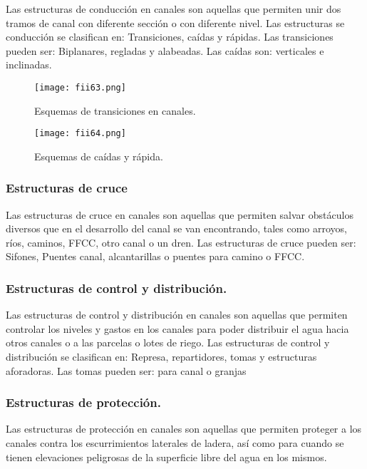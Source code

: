 Las estructuras de conducción en canales son aquellas que permiten unir dos
tramos de canal con diferente sección o con diferente nivel. Las estructuras se
conducción se clasifican en: Transiciones, caídas y rápidas. Las transiciones pueden
ser: Biplanares, regladas y alabeadas. Las caídas son: verticales e inclinadas.

\begin{figure}[h!]
	\centerline{\texttt{[image: fii63.png]}}
	\caption{Esquemas de transiciones en canales.}
	\label{fii63}
\end{figure}

\begin{figure}[h!]
	\centerline{\texttt{[image: fii64.png]}}
	\caption{Esquemas de caídas y rápida.}
	\label{fii64}
\end{figure}

\subsubsection{Estructuras de cruce}

Las estructuras de cruce en canales son aquellas que permiten salvar obstáculos
diversos que en el desarrollo del canal se van encontrando, tales como arroyos, ríos,
caminos, FFCC, otro canal o un dren.
Las estructuras de cruce pueden ser: Sifones, Puentes canal, alcantarillas o
puentes para camino o FFCC.

\subsubsection{Estructuras de control y distribución.}

Las estructuras de control y distribución en canales son aquellas que permiten
controlar los niveles y gastos en los canales para poder distribuir el agua hacia otros
canales o a las parcelas o lotes de riego.
Las estructuras de control y distribución se clasifican en: Represa, repartidores,
tomas y estructuras aforadoras. Las tomas pueden ser: para canal o granjas

\subsubsection{Estructuras de protección.}

Las estructuras de protección en canales son aquellas que permiten proteger a
los canales contra los escurrimientos laterales de ladera, así como para cuando se
tienen elevaciones peligrosas de la superficie libre del agua en los mismos.

